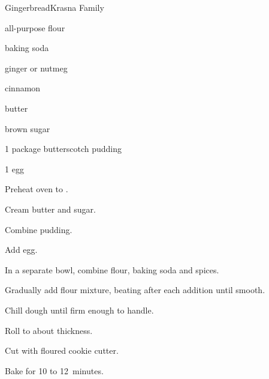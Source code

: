 \begin{recipe}{Gingerbread}{Krasna Family}{}

\begin{ingredients}
\item \C{1\half} all-purpose flour
\item {} baking soda
\item {} ginger or nutmeg
\item \tp{1\half} cinnamon
\item \C{\half} butter
\item \C{\half} brown sugar
\item 1 package butterscotch pudding
\item 1 egg
\end{ingredients}

\begin{directions}
\item Preheat oven to .
\item Cream butter and sugar.
\item Combine pudding.
\item Add egg.
\item In a separate bowl, combine flour, baking soda and spices.
\item Gradually add flour mixture, beating after each addition until smooth.
\item Chill dough until firm enough to handle.
\item Roll to about  thickness.
\item Cut with floured cookie cutter.
\item Bake for 10 to 12~minutes.
\end{directions}
\end{recipe}
